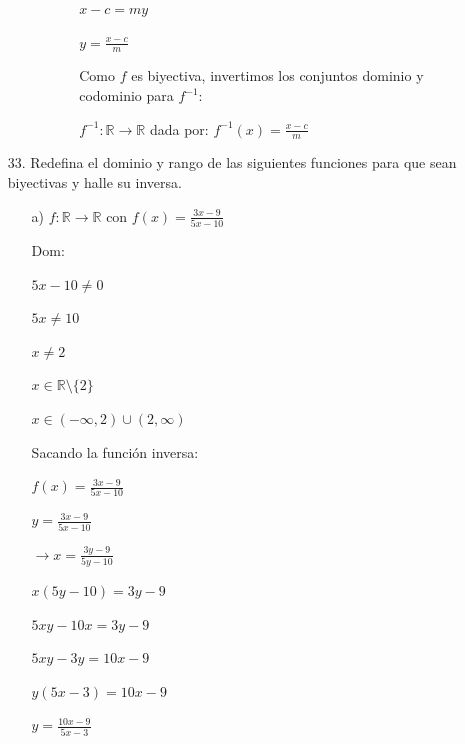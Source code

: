 \documentclass{article}
\begin{document}
\begin{enumerate}
\begin{enumerate}
\begin{itemize}
\begin{enumerate}
                \(x - c = my\)
                
                \(y = \frac{x - c}{m}\)
                \vspace{\baselineskip}
                
                Como \(f\) es biyectiva, invertimos los conjuntos dominio y codominio para \(f^{-1}\):
                
                \(f^{-1} : \mathbb{R} \rightarrow \mathbb{R}\) dada por: \(f^{-1}(x) = \frac{x - c}{m}\)
            \end{enumerate}
        \end{itemize}
    \end{enumerate}
    
\item[33.] Redefina el dominio y rango de las siguientes funciones para que sean biyectivas y halle su inversa.
    \begin{enumerate}
        \item[a)] \(f : \mathbb{R} \rightarrow \mathbb{R} \text{ con } f(x) = \frac{3x - 9}{5x - 10}\)
        
        Dom:
        
        \(5x - 10 \neq 0\)
        
        \(5x \neq 10\)
        
        \(x \neq 2\)
        
        \(x \in \mathbb{R} \setminus \{2\}\)
        
        \(x \in (-\infty, 2) \cup (2, \infty)\)
        \vspace{\baselineskip}
        
        Sacando la función inversa:
        
        \(f(x) = \frac{3x - 9}{5x - 10}\)
        
        \(y = \frac{3x - 9}{5x - 10}\)
        \vspace{\baselineskip}
        
        \(\rightarrow x = \frac{3y - 9}{5y - 10}\)
        
        \(x(5y - 10) = 3y - 9\)
        
        \(5xy - 10x = 3y - 9\)
        
        \(5xy - 3y = 10x - 9\)
        
        \(y(5x - 3) = 10x - 9\)
        
        \(y = \frac{10x - 9}{5x - 3}\)
        \vspace{\baselineskip}
        

\end{enumerate}
\end{enumerate}
\end{document}

